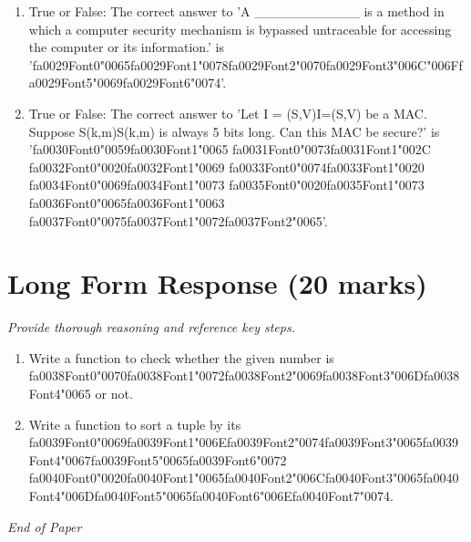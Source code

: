 \documentclass[12pt]{article}
\begin{document}
\begin{enumerate}[label=\arabic*.]
\item True or False: The correct answer to 'A \_\_\_\_\_\_\_\_\_\_\_ is a method in which a computer security mechanism is bypassed untraceable for accessing the computer or its information.' is '{\csname fa0029Font0\endcsname\char"0065}{\csname fa0029Font1\endcsname\char"0078}{\csname fa0029Font2\endcsname\char"0070}{\csname fa0029Font3\endcsname\char"006C}{\char"006F}{\csname fa0029Font5\endcsname\char"0069}{\csname fa0029Font6\endcsname\char"0074}'.
\item True or False: The correct answer to 'Let I = (S,V)I=(S,V) be a MAC. Suppose S(k,m)S(k,m) is always 5 bits long. Can this MAC be secure?' is '{\csname fa0030Font0\endcsname\char"0059}{\csname fa0030Font1\endcsname\char"0065} {\csname fa0031Font0\endcsname\char"0073}{\csname fa0031Font1\endcsname\char"002C} {\csname fa0032Font0\endcsname\char"0020}{\csname fa0032Font1\endcsname\char"0069} {\csname fa0033Font0\endcsname\char"0074}{\csname fa0033Font1\endcsname\char"0020} {\csname fa0034Font0\endcsname\char"0069}{\csname fa0034Font1\endcsname\char"0073} {\csname fa0035Font0\endcsname\char"0020}{\csname fa0035Font1\endcsname\char"0073} {\csname fa0036Font0\endcsname\char"0065}{\csname fa0036Font1\endcsname\char"0063} {\csname fa0037Font0\endcsname\char"0075}{\csname fa0037Font1\endcsname\char"0072}{\csname fa0037Font2\endcsname\char"0065}'.
\end{enumerate}

\section*{Long Form Response (20 marks)}
\textit{Provide thorough reasoning and reference key steps.}
\begin{enumerate}[label=\arabic*.]
\item Write a function to check whether the given number is {\csname fa0038Font0\endcsname\char"0070}{\csname fa0038Font1\endcsname\char"0072}{\csname fa0038Font2\endcsname\char"0069}{\csname fa0038Font3\endcsname\char"006D}{\csname fa0038Font4\endcsname\char"0065} or not.
\item Write a function to sort a tuple by its {\csname fa0039Font0\endcsname\char"0069}{\csname fa0039Font1\endcsname\char"006E}{\csname fa0039Font2\endcsname\char"0074}{\csname fa0039Font3\endcsname\char"0065}{\csname fa0039Font4\endcsname\char"0067}{\csname fa0039Font5\endcsname\char"0065}{\csname fa0039Font6\endcsname\char"0072} {\csname fa0040Font0\endcsname\char"0020}{\csname fa0040Font1\endcsname\char"0065}{\csname fa0040Font2\endcsname\char"006C}{\csname fa0040Font3\endcsname\char"0065}{\csname fa0040Font4\endcsname\char"006D}{\csname fa0040Font5\endcsname\char"0065}{\csname fa0040Font6\endcsname\char"006E}{\csname fa0040Font7\endcsname\char"0074}.
\end{enumerate}

\vfill
\noindent\textit{End of Paper}
\end{document}
